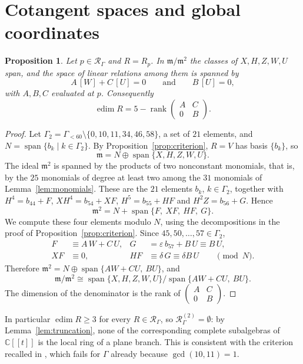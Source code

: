 \documentclass{amsart}
\newtheorem{proposition}[theorem]{Proposition}
\theoremstyle{definition}
\theoremstyle{remark}
\numberwithin{equation}{section}
\newcommand{\CC}{\mathbb{C}}
\newcommand{\Rs}{\mathcal{R}_\Gamma}
\newcommand{\Rd}[1]{\mathcal{R}^{(#1)}_\Gamma}
\newcommand{\m}{\mathfrak{m}}
\newcommand{\ps}{[\![t]\!]}
\DeclareMathOperator{\edim}{edim}
\DeclareMathOperator{\rank}{rank}
\DeclareMathOperator{\spn}{span}
\begin{document}
\section{Cotangent spaces and global coordinates}\label{sec:cotangent}

\begin{proposition}\label{prop:cotangent}
Let $p\in\Rs$ and $R=R_p$. In $\m/\m^2$ the classes of $X,H,Z,W,U$ span, and the space of linear relations among them is spanned by
\[
A\,[W]+C\,[U]=0\qquad\text{and}\qquad B\,[U]=0,
\]
with $A,B,C$ evaluated at $p$. Consequently
\[
\edim R=5-\rank\begin{pmatrix}A&C\\0&B\end{pmatrix}.
\]
\end{proposition}

\begin{proof}
Let $\Gamma_2=\Gamma_{<60}\setminus\{0,10,11,34,46,58\}$, a set of $21$ elements, and $N=\spn\{b_k\mid k\in\Gamma_2\}$. By Proposition~\ref{prop:criterion}, $R=V$ has basis $\{b_k\}$, so
\[
\m=N\oplus\spn\{X,H,Z,W,U\}.
\]
The ideal $\m^2$ is spanned by the products of two nonconstant monomials, that is, by the $25$ monomials of degree at least two among the $31$ monomials of Lemma~\ref{lem:monomials}. These are the $21$ elements $b_k$, $k\in\Gamma_2$, together with $H^4=b_{44}+F$, $XH^4=b_{54}+XF$, $H^5=b_{55}+HF$ and $H^2Z=b_{56}+G$. Hence
\[
\m^2=N+\spn\{F,\ XF,\ HF,\ G\}.
\]
We compute these four elements modulo $N$, using the decompositions in the proof of Proposition~\ref{prop:criterion}. Since $45,50,\dots,57\in\Gamma_2$,
\begin{align*}
F&\equiv A\,W+C\,U, & G&=\varepsilon\,b_{57}+B\,U\equiv B\,U,\\
XF&\equiv0, & HF&\equiv\delta\,G\equiv\delta B\,U \qquad\pmod N.
\end{align*}
Therefore $\m^2=N\oplus\spn\{AW+CU,\ BU\}$, and
\[
\m/\m^2\cong\spn\{X,H,Z,W,U\}\big/\spn\{AW+CU,\ BU\}.
\]
The dimension of the denominator is the rank of $\left(\begin{smallmatrix}A&C\\0&B\end{smallmatrix}\right)$.
\end{proof}

In particular $\edim R\ge3$ for every $R\in\Rs$, so $\Rd{2}=\emptyset$: by Lemma~\ref{lem:truncation}, none of the corresponding complete subalgebras of $\CC\ps$ is the local ring of a plane branch. This is consistent with the criterion recalled in \cite[Section~4.2]{Ham20}, which fails for $\Gamma$ already because $\gcd(10,11)=1$.
\end{document}
